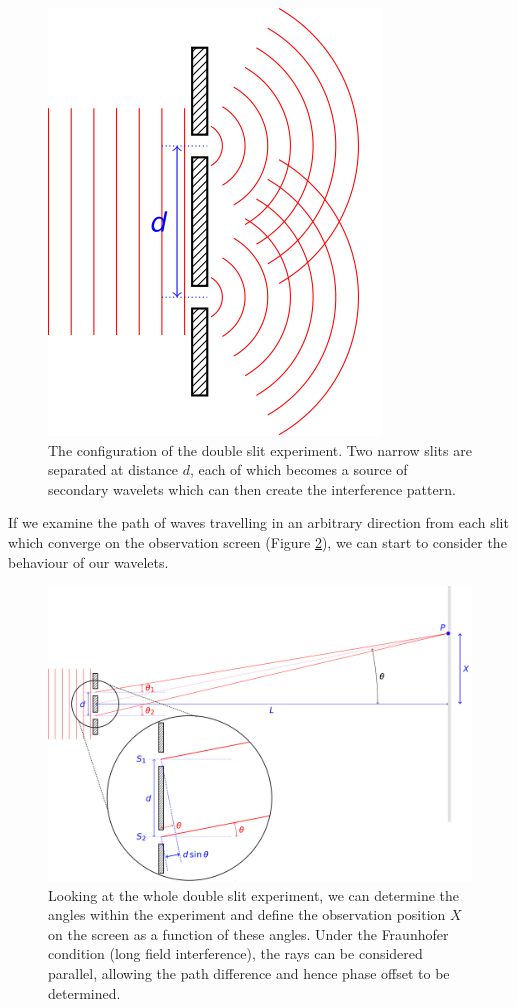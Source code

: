 \documentclass[
]{book}
\begin{document}
\begin{figure}

{\centering \includegraphics[width=0.7\linewidth]{visualisations/LaTeX/ch13-doubleslits} 

}

\caption{The configuration of the double slit experiment. Two narrow slits are separated at distance $d$, each of which becomes a source of secondary wavelets which can then create the interference pattern.}\label{fig:ch13-doubleslit1}
\end{figure}

If we examine the path of waves travelling in an arbitrary direction from each slit which converge on the observation screen (Figure \ref{fig:ch13-doubleslit2}), we can start to consider the behaviour of our wavelets.

\begin{figure}

{\centering \includegraphics[width=0.7\linewidth]{visualisations/LaTeX/ch13-doubleslits2} 

}

\caption{Looking at the whole double slit experiment, we can determine the angles within the experiment and define the observation position $X$ on the screen as a function of these angles. Under the Fraunhofer condition (long field interference), the rays can be considered parallel, allowing the path difference and hence phase offset to be determined.}\label{fig:ch13-doubleslit2}
\end{figure}
\end{document}
